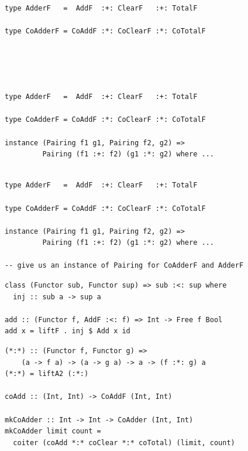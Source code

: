 \documentclass{beamer}
\begin{document}
\begin{frame}[fragile]
  \begin{overprint}
  \begin{verbatim}
type AdderF   =  AddF  :+: ClearF   :+: TotalF

type CoAdderF = CoAddF :*: CoClearF :*: CoTotalF





  \end{verbatim}
  \begin{verbatim}
type AdderF   =  AddF  :+: ClearF   :+: TotalF

type CoAdderF = CoAddF :*: CoClearF :*: CoTotalF

instance (Pairing f1 g1, Pairing f2, g2) =>
         Pairing (f1 :+: f2) (g1 :*: g2) where ...


  \end{verbatim}
  \begin{verbatim}
type AdderF   =  AddF  :+: ClearF   :+: TotalF

type CoAdderF = CoAddF :*: CoClearF :*: CoTotalF

instance (Pairing f1 g1, Pairing f2, g2) =>
         Pairing (f1 :+: f2) (g1 :*: g2) where ...

-- give us an instance of Pairing for CoAdderF and AdderF
  \end{verbatim}
  \end{overprint}
\end{frame}

\begin{frame}[fragile]
  \begin{verbatim}
class (Functor sub, Functor sup) => sub :<: sup where
  inj :: sub a -> sup a

add :: (Functor f, AddF :<: f) => Int -> Free f Bool
add x = liftF . inj $ Add x id
  \end{verbatim}
\end{frame}

\begin{frame}[fragile]
  \begin{verbatim}
(*:*) :: (Functor f, Functor g) =>
    (a -> f a) -> (a -> g a) -> a -> (f :*: g) a
(*:*) = liftA2 (:*:)

coAdd :: (Int, Int) -> CoAddF (Int, Int)

mkCoAdder :: Int -> Int -> CoAdder (Int, Int)
mkCoAdder limit count =
  coiter (coAdd *:* coClear *:* coTotal) (limit, count)
  \end{verbatim}
\end{frame}
\end{document}
